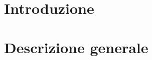 

\setcounter{page}{1}
\pagestyle{normal}


\section{Introduzione}

\section{Descrizione generale}





